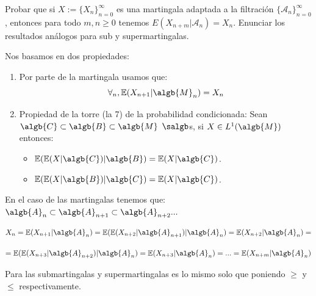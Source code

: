 \begin{problem}[5] Probar que si $X := \{X_n\}_{n=0}^{\infty}$  es una martingala adaptada a la filtraci\'on
$\{\mathcal{A}_n\}_{n=0}^{\infty}$, entonces para todo $m, n\ge 0$ tenemos
$E(X_{n + m}|\mathcal{A}_n) = X_n$. Enunciar los resultados an\'alogos para sub y supermartingalas.
\solution

\begin{expla}
Nos basamos en dos propiedades:
\begin{enumerate}
\item Por parte de la martingala usamos que:
$$\forall_n, \mathbb{E}(X_{n+1}|\algb{M}_n)=X_n$$
\item Propiedad de la torre (la 7) de la probabilidad condicionada:
Sean $\algb{C} \subset \algb{B} \subset \algb{M}$ $\salgb$s, si $X \in L^ 1(\algb{M})$ entonces:
\begin{itemize}
\item $\mathbb{E}(\mathbb{E}(X|\algb{C})|\algb{B}) = \mathbb{E}(X|\algb{C})$.
\item $\mathbb{E}(\mathbb{E}(X|\algb{B})|\algb{C}) = \mathbb{E}(X|\algb{C})$.
\end{itemize}
\end{enumerate}
\end{expla}
En el caso de las martingalas tenemos que:
$\algb{A}_n \subset \algb{A}_{n+1} \subset \algb{A}_{n+2}...$

\[
X_n = \mathbb{E}(X_{n+1}|\algb{A}_n) = \mathbb{E}(\mathbb{E}(X_{n+2}|\algb{A}_{n+1})|\algb{A}_n) = \mathbb{E}(X_{n+2}|\algb{A}_n) =
\]

\[
= \mathbb{E}(\mathbb{E}(X_{n+3}|\algb{A}_{n+2})|\algb{A}_n) =
\mathbb{E}(X_{n+3}|\algb{A}_n) = ... = \mathbb{E}(X_{n+m}|\algb{A}_n)
\]

Para las submartingalas y supermartingalas es lo mismo solo que poniendo $\geq$ y $\leq$ respectivamente.
\end{problem}


